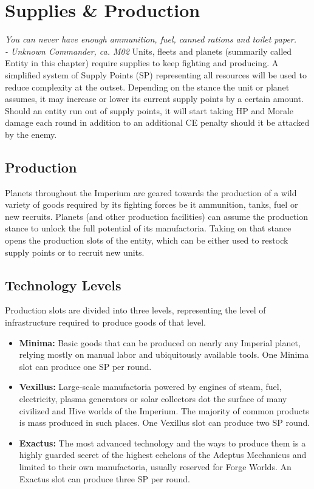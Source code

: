 \chapter{Supplies \& Production}
\textit{You can never have enough ammunition, fuel, canned rations and toilet paper. \\- Unknown Commander, ca. M02}
Units, fleets and planets (summarily called Entity in this chapter) require supplies to keep fighting and producing. 
A simplified system of Supply Points (SP) representing all resources will be used to reduce complexity at the outset.
Depending on the stance the unit or planet assumes, it may increase or lower its current supply points by a certain amount.
Should an entity run out of supply points, it will start taking HP and Morale damage each round in addition to an additional CE penalty should it be attacked by the enemy.

\section{Production}
Planets throughout the Imperium are geared towards the production of a wild variety of goods required by its fighting forces be it ammunition, tanks, fuel or new recruits.
Planets (and other production facilities) can assume the production stance to unlock the full potential of its manufactoria.
Taking on that stance opens the production slots of the entity, which can be either used to restock supply points or to recruit new units.

\section{Technology Levels}
Production slots are divided into three levels, representing the level of infrastructure required to produce goods of that level.
\begin{itemize}
	\item \textbf{Minima:} Basic goods that can be produced on nearly any Imperial planet, relying mostly on manual labor and ubiquitously available tools. One Minima slot can produce one SP per round.
	\item \textbf{Vexillus:} Large-scale manufactoria powered by engines of steam, fuel, electricity, plasma generators or solar collectors dot the surface of many civilized and Hive worlds of the Imperium. The majority of common products is mass produced in such places. One Vexillus slot can produce two SP round.
	\item \textbf{Exactus:} The most advanced technology and the ways to produce them is a highly guarded secret of the highest echelons of the Adeptus Mechanicus and limited to their own manufactoria, usually reserved for Forge Worlds. An Exactus slot can produce three SP per round.
\end{itemize}

